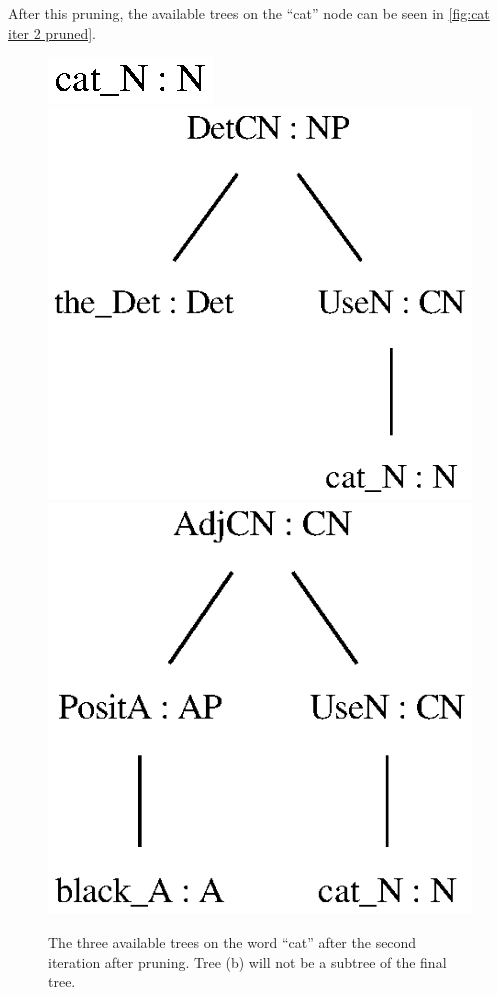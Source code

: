 After this pruning, the available trees on the ``cat'' node can be seen in  \autoref{fig:cat iter 2 pruned}.
\begin{figure}[H]
    \centering
        {\includegraphics[scale=0.7]{figure/black_cats/cat_N_gf.eps}}
        {\includegraphics[scale=0.7]{figure/black_cats/the_cat_NP_gf.eps}}
        {\includegraphics[scale=0.7]{figure/black_cats/black_cat_CN_gf.eps}}
    \caption{The three available trees on the word ``cat'' after the second iteration after pruning. Tree (b) will not be a subtree of the final tree.}\label{fig:cat iter 2 pruned}
\end{figure}
